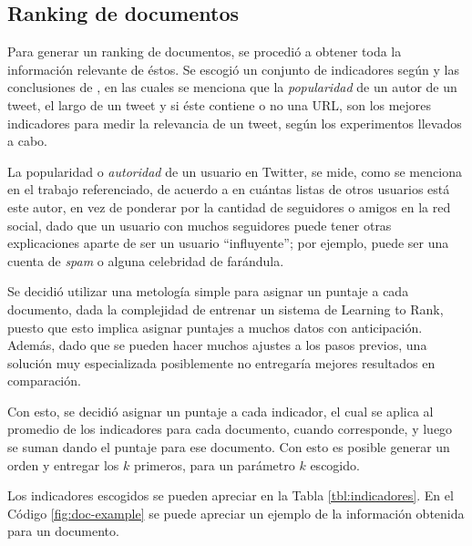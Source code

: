 \subsection{Ranking de documentos}
\label{sec-4.2.3}


    Para generar un ranking de documentos, se procedió a obtener toda
    la información relevante de éstos. Se escogió un conjunto de
    indicadores según \cite{Castillo:2011:ICT:1963405.1963500} y las
    conclusiones de \cite{Duan:2010:ESL:1873781.1873815}, en
    las cuales se menciona
    que la \emph{popularidad} de un autor de un tweet, el largo de un tweet
    y si éste contiene o no una URL, son los mejores indicadores para
    medir la relevancia de un tweet, según los experimentos llevados a
    cabo.

    La popularidad o \emph{autoridad} de un usuario en Twitter, se mide,
    como se menciona en el trabajo referenciado, de acuerdo a en
    cuántas listas de otros usuarios está este autor, en vez de
    ponderar por la cantidad de seguidores o amigos en la red social,
    dado que un usuario con muchos seguidores puede tener otras
    explicaciones aparte de ser un usuario ``influyente''; por ejemplo,
    puede ser una cuenta de \emph{spam} o alguna celebridad de farándula.

    Se decidió utilizar una metología simple para asignar un puntaje a
    cada documento, dada la complejidad de entrenar un sistema de
    Learning to Rank, puesto que esto implica asignar puntajes a muchos datos con
    anticipación. Además, dado que se pueden hacer muchos ajustes a los
    pasos previos, una solución muy especializada posiblemente no
    entregaría mejores resultados en comparación.

    Con esto, se decidió asignar un puntaje a cada indicador, el cual se aplica
    al promedio de los indicadores para cada documento, cuando
    corresponde, y luego se suman dando el puntaje para ese
    documento. Con esto es posible generar un orden y entregar los $k$
    primeros, para un parámetro $k$ escogido.

    Los indicadores escogidos se pueden apreciar en la Tabla
    \ref{tbl:indicadores}. En el Código \ref{fig:doc-example} se puede
    apreciar un ejemplo de la información obtenida para un documento.




